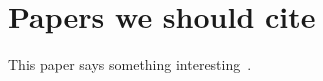 \documentclass[9pt,twocolumn,twoside]{pnas-new}
\begin{document}
\section{Papers we should cite}
This paper says something interesting~\cite{leschziner}.

\pnasbreak


\end{document}
